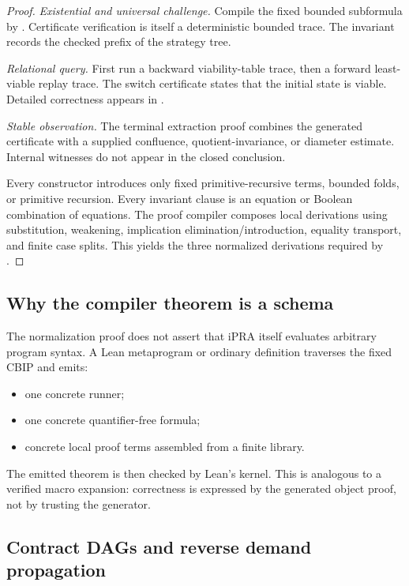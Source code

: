 \begin{proof}
\emph{Existential and universal challenge.}  Compile the fixed bounded subformula by .  Certificate verification is itself a deterministic bounded trace.  The invariant records the checked prefix of the strategy tree.

\emph{Relational query.}  First run a backward viability-table trace, then a forward least-viable replay trace.  The switch certificate states that the initial state is viable.  Detailed correctness appears in .

\emph{Stable observation.}  The terminal extraction proof combines the generated certificate with a supplied confluence, quotient-invariance, or diameter estimate.  Internal witnesses do not appear in the closed conclusion.

Every constructor introduces only fixed primitive-recursive terms, bounded folds, or primitive recursion.  Every invariant clause is an equation or Boolean combination of equations.  The proof compiler composes local  derivations using substitution, weakening, implication elimination/introduction, equality transport, and finite case splits.  This yields the three normalized derivations required by .
\end{proof}

\subsection{Why the compiler theorem is a schema}

The normalization proof does not assert that iPRA itself evaluates arbitrary program syntax.  A Lean metaprogram or ordinary definition traverses the fixed CBIP and emits:
\begin{itemize}
\item one concrete  runner;
\item one concrete quantifier-free formula;
\item concrete local proof terms assembled from a finite library.
\end{itemize}
The emitted theorem is then checked by Lean's kernel.  This is analogous to a verified macro expansion: correctness is expressed by the generated object proof, not by trusting the generator.

\subsection{Contract DAGs and reverse demand propagation}

